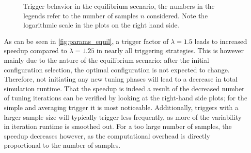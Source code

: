 \begin{figure}[htpb]
\begin{subfigure}{0.45\textwidth}
	\end{subfigure}%
	\caption{Trigger behavior in the equilibrium scenario, the numbers in the legends refer to the number of samples $n$ considered. Note the logarithmic scale in the plots on the right hand side.}
	\label{fig:params_equil}
\end{figure}

As can be seen in \autoref{fig:params_equil}, a trigger factor of $\lambda=1.5$ leads to increased speedup compared to $\lambda=1.25$ in nearly all triggering strategies. This is however mainly due to the nature of the equilibrium scenario: after the initial configuration selection, the optimal configuration is not expected to change.
Therefore, not initiating any new tuning phases will lead to a decrease in total simulation runtime. That the speedup is indeed  a result of the decreased number of tuning iterations can be verified by looking at the right-hand side plots; for the simple and averaging trigger it is most noticeable.
Additionally, triggers with a larger sample size will typically trigger less frequently, as more of the variability in iteration runtime is smoothed out. For a too large number of samples, the speedup decreases however, as the computational overhead is directly proportional to the number of samples.


